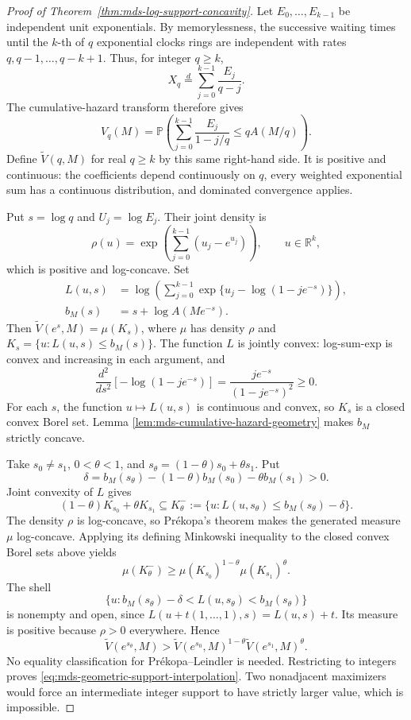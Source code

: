 \documentclass[11pt]{article}
\theoremstyle{definition}
\theoremstyle{remark}
\newcommand{\Pbb}{\mathbb P}
\newcommand{\R}{\mathbb R}
\newcommand{\1}{\mathbf 1}
\begin{document}
\begin{proof}[Proof of Theorem~\ref{thm:mds-log-support-concavity}]
Let \(E_0,\ldots,E_{k-1}\) be independent unit exponentials.
By memorylessness, the successive waiting times until the \(k\)-th
of \(q\) exponential clocks rings are independent with rates
\(q,q-1,\ldots,q-k+1\). Thus, for integer \(q\ge k\),
\[
 X_q\stackrel d=\sum_{j=0}^{k-1}\frac{E_j}{q-j}.
\]
The cumulative-hazard transform therefore gives
\begin{equation}\label{eq:mds-support-spacing}
 V_q(M)=\Pbb\left(
 \sum_{j=0}^{k-1}\frac{E_j}{1-j/q}\le qA(M/q)\right).
\end{equation}
Define \(\widetilde V(q,M)\) for real \(q\ge k\) by this same
right-hand side. It is positive and continuous: the coefficients
depend continuously on \(q\), every weighted exponential sum has
a continuous distribution, and dominated convergence applies.

Put \(s=\log q\) and \(U_j=\log E_j\). Their joint density is
\begin{equation}\label{eq:mds-logexp-density}
 \rho(u)=\exp\left(\sum_{j=0}^{k-1}(u_j-e^{u_j})\right),
 \qquad u\in\R^k,
\end{equation}
which is positive and log-concave. Set
\begin{align}
 L(u,s)&=\log\left(\sum_{j=0}^{k-1}
   \exp\{u_j-\log(1-je^{-s})\}\right),
   \label{eq:mds-joint-logsum}\\
 b_M(s)&=s+\log A(Me^{-s}).
   \label{eq:mds-log-support-boundary}
\end{align}
Then \(\widetilde V(e^s,M)=\mu(K_s)\), where \(\mu\) has density
\(\rho\) and \(K_s=\{u:L(u,s)\le b_M(s)\}\).
The function \(L\) is jointly convex: log-sum-exp is convex and
increasing in each argument, and
\[
 \frac{d^2}{ds^2}[-\log(1-je^{-s})]
 =\frac{je^{-s}}{(1-je^{-s})^2}\ge0.
\]
For each \(s\), the function \(u\mapsto L(u,s)\) is continuous and
convex, so \(K_s\) is a closed convex Borel set.  Lemma
\ref{lem:mds-cumulative-hazard-geometry} makes \(b_M\) strictly
concave.

Take \(s_0\ne s_1\), \(0<\theta<1\), and
\(s_\theta=(1-\theta)s_0+\theta s_1\). Put
\[
 \delta=b_M(s_\theta)-(1-\theta)b_M(s_0)-\theta b_M(s_1)>0.
\]
Joint convexity of \(L\) gives
\[
 (1-\theta)K_{s_0}+\theta K_{s_1}
 \subseteq
 K_\theta^-:=\{u:L(u,s_\theta)\le b_M(s_\theta)-\delta\}.
\]
The density \(\rho\) is log-concave, so Pr\'ekopa's theorem
\cite[Theorem 2]{Prekopa1973} makes the generated measure \(\mu\)
log-concave.  Applying its defining Minkowski inequality to the closed
convex Borel sets above yields
\[
 \mu(K_\theta^-)
 \ge\mu(K_{s_0})^{1-\theta}\mu(K_{s_1})^\theta.
\]
The shell
\[
 \{u:b_M(s_\theta)-\delta<L(u,s_\theta)<b_M(s_\theta)\}
\]
is nonempty and open, since
\(L(u+t(1,\ldots,1),s)=L(u,s)+t\). Its measure is positive
because \(\rho>0\) everywhere. Hence
\[
 \widetilde V(e^{s_\theta},M)>
 \widetilde V(e^{s_0},M)^{1-\theta}
 \widetilde V(e^{s_1},M)^\theta.
\]
No equality classification for Pr\'ekopa--Leindler is needed.
Restricting to integers proves
\eqref{eq:mds-geometric-support-interpolation}. Two nonadjacent
maximizers would force an intermediate integer support to have
strictly larger value, which is impossible.
\end{proof}
\end{document}
